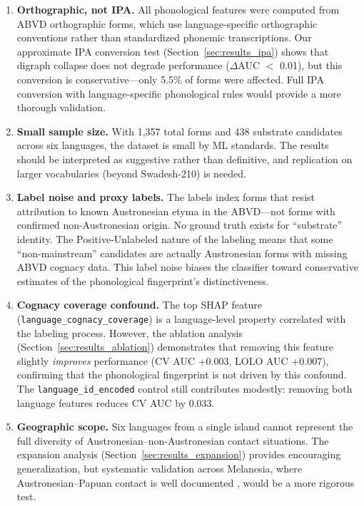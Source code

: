 \documentclass[12pt]{article}
\begin{document}
\begin{enumerate}
    \item \textbf{Orthographic, not IPA.} All phonological features were computed from ABVD orthographic forms, which use language-specific orthographic conventions rather than standardized phonemic transcriptions. Our approximate IPA conversion test (Section~\ref{sec:results_ipa}) shows that digraph collapse does not degrade performance ($\Delta$AUC $<$ 0.01), but this conversion is conservative---only 5.5\% of forms were affected. Full IPA conversion with language-specific phonological rules would provide a more thorough validation.

    \item \textbf{Small sample size.} With 1,357 total forms and 438 substrate candidates across six languages, the dataset is small by ML standards. The results should be interpreted as suggestive rather than definitive, and replication on larger vocabularies (beyond Swadesh-210) is needed.

    \item \textbf{Label noise and proxy labels.} The labels index forms that resist attribution to known Austronesian etyma in the ABVD---not forms with confirmed non-Austronesian origin. No ground truth exists for ``substrate'' identity. The Positive-Unlabeled nature of the labeling means that some ``non-mainstream'' candidates are actually Austronesian forms with missing ABVD cognacy data. This label noise biases the classifier toward conservative estimates of the phonological fingerprint's distinctiveness.

    \item \textbf{Cognacy coverage confound.} The top SHAP feature (\texttt{language\_cognacy\_coverage}) is a language-level property correlated with the labeling process. However, the ablation analysis (Section~\ref{sec:results_ablation}) demonstrates that removing this feature slightly \textit{improves} performance (CV AUC +0.003, LOLO AUC +0.007), confirming that the phonological fingerprint is not driven by this confound. The \texttt{language\_id\_encoded} control still contributes modestly: removing both language features reduces CV AUC by 0.033.

    \item \textbf{Geographic scope.} Six languages from a single island cannot represent the full diversity of Austronesian--non-Austronesian contact situations. The expansion analysis (Section~\ref{sec:results_expansion}) provides encouraging generalization, but systematic validation across Melanesia, where Austronesian--Papuan contact is well documented \citep{ross2005, dunn2005}, would be a more rigorous test.


\end{enumerate}
\end{document}
